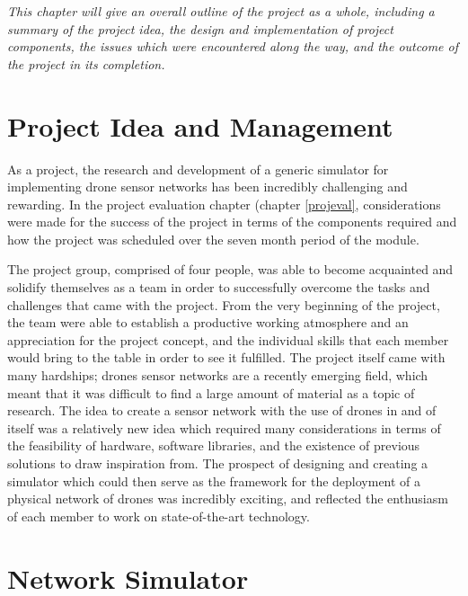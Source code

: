 \emph{This chapter will give an overall outline of the project as a whole, including a summary of the project idea, the design and implementation of project components, the issues which were encountered along the way, and the outcome of the project in its completion.}

\section{Project Idea and Management}
As a project, the research and development of a generic simulator for implementing drone sensor networks has been incredibly challenging and rewarding. In the project evaluation chapter (chapter \ref{projeval}, considerations were made for the success of the project in terms of the components required and how the project was scheduled over the seven month period of the module. 

The project group, comprised of four people, was able to become acquainted and solidify themselves as a team in order to successfully overcome the tasks and challenges that came with the project. From the very beginning of the project, the team were able to establish a productive working atmosphere and an appreciation for the project concept, and the individual skills that each member would bring to the table in order to see it fulfilled. The project itself came with many hardships; drones sensor networks are a recently emerging field, which meant that it was difficult to find a large amount of material as a topic of research. The idea to create a sensor network with the use of drones in and of itself was a relatively new idea which required many considerations in terms of the feasibility of hardware, software libraries, and the existence of previous solutions to draw inspiration from. The prospect of designing and creating a simulator which could then serve as the framework for the deployment of a physical network of drones was incredibly exciting, and reflected the enthusiasm of each member to work on state-of-the-art technology. 

\section{Network Simulator}

